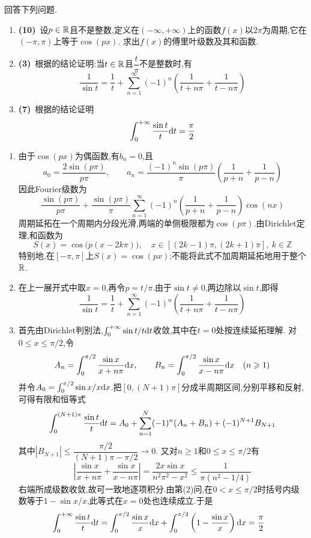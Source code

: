 \documentclass{ctexart}
\begin{document}
\begin{problem}[6.(20\songti{分})]
回答下列问题.
        \begin{enumerate}[label=\tbf{(\arabic*)},topsep=0pt,parsep=0pt,itemsep=0pt,partopsep=0pt]
            \item \textbf{(10)}\ 设$p\in\mathbb{R}$且不是整数,定义在$(-\infty,+\infty)$上的函数$f(x)$以$2\pi$为周期,它在$(-\pi,\pi)$上等于$\cos(px)$.%
                求出$f(x)$的傅里叶级数及其和函数.
            \item \textbf{(3)}\ 根据的结论证明:当$t\in\mathbb{R}$且$\dfrac{t}{\pi}$不是整数时,有
                \[\dfrac{1}{\sin t}=\dfrac1t+\sum_{n=1}^{\infty}(-1)^n\left(\dfrac{1}{t+n\pi}+\dfrac{1}{t-n\pi}\right)\]
            \item \textbf{(7)}\ 根据的结论证明
                \[\int_0^{+\infty}\dfrac{\sin t}{t}\mathrm{d} t=\dfrac\pi2\]

        \end{enumerate}
\end{problem}
\begin{solution}
\begin{enumerate}[label=\tbf{(\arabic*)},topsep=0pt,parsep=0pt,itemsep=0pt,partopsep=0pt]
\item 由于$\cos(px)$为偶函数,有$b_n=0$,且
\[a_0=\frac{2\sin(p\pi)}{p\pi},\qquad
a_n=\frac{(-1)^n\sin(p\pi)}\pi\left(\frac1{p+n}+\frac1{p-n}\right)\]
因此Fourier级数为
\[\frac{\sin(p\pi)}{p\pi}+\frac{\sin(p\pi)}\pi
\sum_{n=1}^{\infty}(-1)^n\left(\frac1{p+n}+\frac1{p-n}\right)\cos(nx)\]
周期延拓在一个周期内分段光滑,两端的单侧极限都为$\cos(p\pi)$.由Dirichlet定理,和函数为
\[S(x)=\cos\bigl(p(x-2k\pi)\bigr),\quad
x\in[(2k-1)\pi,(2k+1)\pi],\ k\in\mathbb Z\]
特别地,在$[-\pi,\pi]$上$S(x)=\cos(px)$;不能将此式不加周期延拓地用于整个$\mathbb{R}$.
\item 在上一展开式中取$x=0$,再令$p=t/\pi$.由于$\sin t\neq0$,两边除以$\sin t$,即得
\[\frac1{\sin t}=\frac1t+\sum_{n=1}^{\infty}(-1)^n
\left(\frac1{t+n\pi}+\frac1{t-n\pi}\right)\]
\item 首先由Dirichlet判别法,$\int_0^{+\infty}\sin t/t\mathrm{d} t$收敛,其中在$t=0$处按连续延拓理解.
对$0\leqslant x\leqslant\pi/2$,令
\[A_n=\int_0^{\pi/2}\frac{\sin x}{x+n\pi}\mathrm{d} x,\qquad
B_n=\int_0^{\pi/2}\frac{\sin x}{x-n\pi}\mathrm{d} x\quad(n\geqslant1)\]
并令$A_0=\int_0^{\pi/2}\sin x/x\mathrm{d} x$.把$[0,(N+1)\pi]$分成半周期区间,分别平移和反射,可得有限和恒等式
\[\int_0^{(N+1)\pi}\frac{\sin t}{t}\mathrm{d} t
=A_0+\sum_{n=1}^{N}(-1)^n(A_n+B_n)+(-1)^{N+1}B_{N+1}\]
其中$|B_{N+1}|\leqslant\dfrac{\pi/2}{(N+1)\pi-\pi/2}\to0$.
又对$n\geqslant1$和$0\leqslant x\leqslant\pi/2$有
\[\left|\frac{\sin x}{x+n\pi}+\frac{\sin x}{x-n\pi}\right|
=\frac{2x\sin x}{n^2\pi^2-x^2}
\leqslant\frac1{\pi(n^2-1/4)}\]
右端所成级数收敛,故可一致地逐项积分.由第(2)问,在$0<x\leqslant\pi/2$时括号内级数等于$1-\sin x/x$,此等式在$x=0$处也连续成立.于是
\[\begin{aligned}
\int_0^{+\infty}\frac{\sin t}{t}\mathrm{d} t
&=\int_0^{\pi/2}\frac{\sin x}{x}\mathrm{d} x+
\int_0^{\pi/2}\left(1-\frac{\sin x}{x}\right)\mathrm{d} x=\frac\pi2
\end{aligned}\]
\end{enumerate}
\end{solution}
\end{document}
